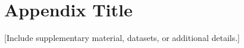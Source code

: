 \appendix
\chapter{Appendix Title}
[Include supplementary material, datasets, or additional details.]